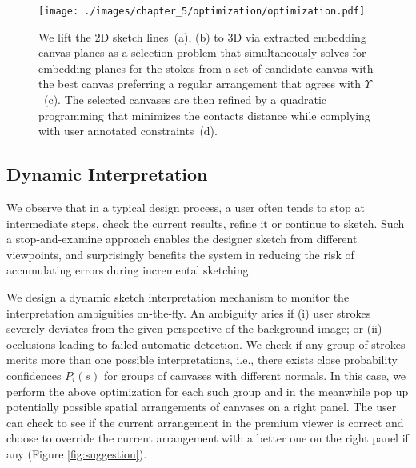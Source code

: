 \begin{figure}%
  \texttt{[image: ./images/chapter\_5/optimization/optimization.pdf]}
  \caption[Canvas optimization.]{We lift the 2D sketch lines~(a), (b) to 3D via extracted embedding canvas planes as a selection problem that simultaneously solves for embedding planes for the stokes from a set of candidate canvas with the best canvas preferring a regular arrangement that agrees with $\Upsilon$~(c). The selected canvases are then refined by a quadratic programming that minimizes the contacts distance while complying with user annotated constraints~(d). }
  \label{fig:optimization}
\end{figure}

\subsection{Dynamic Interpretation}

We observe that in a typical design process, a user often tends to stop at intermediate steps, check the current results, refine it or continue to sketch. Such a stop-and-examine approach enables the designer sketch from different viewpoints, and surprisingly benefits the system in reducing the risk of accumulating errors during incremental sketching.

We design a dynamic sketch interpretation mechanism to
monitor the interpretation ambiguities on-the-fly. An ambiguity aries if (i) user strokes severely deviates from the given perspective of the background image; or (ii) occlusions leading to failed automatic detection. We check if any group of strokes merits more than one possible interpretations, i.e., there exists close probability confidences $P_i(s)$ for groups of canvases with different normals. In this case, we perform the above optimization for each such group and in the meanwhile pop up potentially possible spatial arrangements of canvases on a right panel. The user can check to see if the current arrangement in the premium viewer is correct and choose to override the current arrangement with a better one on the right panel if any (Figure \ref{fig:suggestion}).

